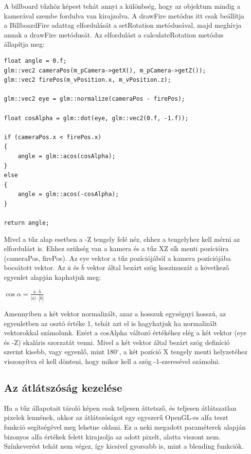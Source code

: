 A billboard tűzhöz képest tehát annyi a különbség, hogy az objektum mindig a kamerával szembe fordulva van kirajzolva. A drawFire metódus itt csak beállítja a BillboardFire adattag elfordulását a setRotation metódusával, majd meghívja annak a drawFire metódusát. Az elfordulást a calculateRotation metódus állapítja meg:
\begin{lstlisting}
float angle = 0.f;
glm::vec2 cameraPos(m_pCamera->getX(), m_pCamera->getZ());
glm::vec2 firePos(m_vPosition.x, m_vPosition.z);

glm::vec2 eye = glm::normalize(cameraPos - firePos);

float cosAlpha = glm::dot(eye, glm::vec2(0.f, -1.f)); 

if (cameraPos.x < firePos.x)
{
	angle = glm::acos(cosAlpha);
}
else
{
	angle = glm::acos(-cosAlpha);
}

return angle;
\end{lstlisting}
Mivel a tűz alap esetben a -Z tengely felé néz, ehhez a tengelyhez kell mérni az elfordulást is. Ehhez szükség van a kamera és a tűz XZ sík menti pozícióira (cameraPos, firePos). Az eye vektor a tűz pozíciójából a kamera pozíciójába bocsátott vektor. Az $\bar{a}$ és $\bar{b}$ vektor által bezárt szög koszinuszát a következő egyenlet alapján kaphatjuk meg: 
\begin{center}
$\cos \alpha = \frac{\bar{a} \cdot \bar{b}}{|\bar{a}| \cdot |\bar{b}|}$
\end{center}
Amennyiben a két vektor normalizált, azaz a hosszuk egységnyi hosszú, az egyenletben az osztó értéke 1, tehát azt el is hagyhatjuk ha normalizált vektorokkal számolunk. Ezért a cosAlpha változó értékéhez elég a két vektor (eye és -Z) skaláris szorzatát venni. Mivel a két vektor által bezárt szög definíció szerint kisebb, vagy egyenlő, mint 180$^{\circ}$, a két pozíció X tengely menti helyzetéhez viszonyítva el kell dönteni, hogy mikor kell a szög -1-szeresével számolni. 

\subsection{Az átlátszóság kezelése}
Ha a tűz állapotait tároló képen csak teljesen áttetsző, és teljesen átlátszatlan pixelek lennének, akkor az átlátszóságot egy egyszerű OpenGL-es alfa teszt funkció segítségével meg lehetne oldani. Ez a neki megadott paraméterek alapján bizonyos alfa értékek felett kirajzolja az adott pixelt, alatta viszont nem. Színkeverést tehát nem végez, így kicsivel gyorsabb is, mint a blending funkciók.

